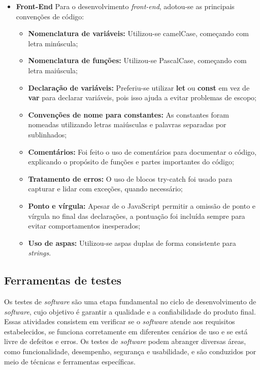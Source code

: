 \begin{itemize}
    \item \textbf{Front-End}
     Para o desenvolvimento \textit{front-end}, adotou-se as principais convenções de código:
     \begin{itemize}
        \item \textbf{Nomenclatura de variáveis:}
        Utilizou-se camelCase, começando com letra minúscula;
        \item \textbf{Nomenclatura de funções:}
        Utilizou-se PascalCase, começando com letra maiúscula;
        \item \textbf{Declaração de variáveis:}
        Preferiu-se utilizar \textbf{let} ou \textbf{const} em vez de \textbf{var} para declarar variáveis, pois isso ajuda a evitar problemas de escopo;
        \item \textbf{Convenções de nome para constantes:}
        As constantes foram nomeadas utilizando letras maiúsculas e palavras separadas por sublinhados;
        \item \textbf{Comentários:}
        Foi feito o uso de comentários para documentar o código, explicando o propósito de funções e partes importantes do código;
        \item \textbf{Tratamento de erros:}
        O uso de blocos try-catch foi usado para capturar e lidar com exceções, quando necessário;
        \item \textbf{Ponto e vírgula:}
         Apesar de o JavaScript permitir a omissão de ponto e vírgula no final das declarações, a pontuação foi incluída sempre para evitar comportamentos inesperados;
        \item \textbf{Uso de aspas:}
        Utilizou-se aspas duplas de forma consistente para \textit{strings}.
 
     \end{itemize}
\end{itemize}
\subsection{Ferramentas de testes}

Os testes de \textit{software} são uma etapa fundamental no ciclo de desenvolvimento de \textit{software}, cujo objetivo é garantir a qualidade e a confiabilidade do produto final. Essas atividades consistem em verificar se o \textit{software} atende aos requisitos estabelecidos, se funciona corretamente em diferentes cenários de uso e se está livre de defeitos e erros. Os testes de \textit{software} podem abranger diversas áreas, como funcionalidade, desempenho, segurança e usabilidade, e são conduzidos por meio de técnicas e ferramentas específicas. 

